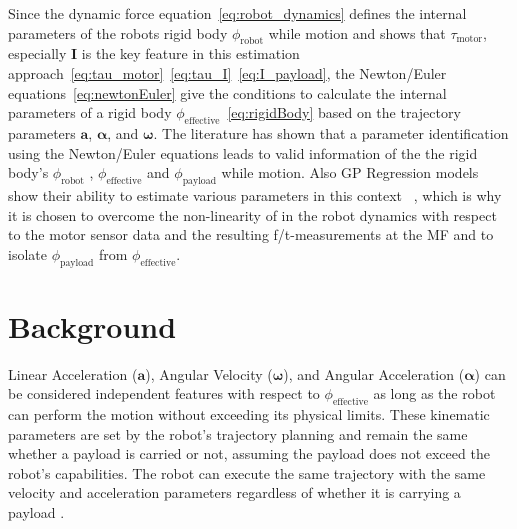     Since the dynamic force equation~\eqref{eq:robot_dynamics} defines the internal parameters of the robots rigid body \(\phi_{\text{robot}}\) while motion and shows that \(\tau_{\text{motor}}\), especially \(\mathbf{I}\) is the key feature in this estimation approach~\eqref{eq:tau_motor}~\eqref{eq:tau_I}~\eqref{eq:I_payload}, the Newton/Euler equations~\eqref{eq:newtonEuler} give the conditions to calculate the internal parameters of a rigid body \(\phi_{\text{effective}}\)~\eqref{eq:rigidBody} based on the trajectory parameters \(\mathbf{a}\), \(\boldsymbol{\alpha}\), and \(\boldsymbol{\omega}\). The literature has shown that a parameter identification using the Newton/Euler equations leads to valid information of the the rigid body's \(\phi_{\text{robot}}\) \cite{lee2020adaptive, nguyen2008learning, ren2020learning, leon2022parameter, dong2023dynamic, golluccio2021robot, deng2021dynamic}, \(\phi_{\text{effective}}\) \cite{haninger2022model, HANINGER2023104431, beckers2017stable, berger2015learning,blumberg2023estimation, motor_current_estimation, an2023, lu2023external, Kruzic2021, shan2024fine, berger2016estimating, liu2021sensorless, su2021deep} and \(\phi_{\text{payload}}\) \cite{Hu2020, Xu2022accurate, kurdas2022online, nadeau2022fast} while motion. Also GP Regression models show their ability to estimate various parameters in this context ~\cite{haninger2022model, beckers2017stable,nguyen2008learning, HANINGER2023104431,blumberg2023estimation,berger2015learning}, which is why it is chosen to overcome the non-linearity of in the robot dynamics with respect to the motor sensor data and the resulting f/t-measurements at the MF and to isolate \(\phi_{\text{payload}}\) from \(\phi_{\text{effective}}\).
    \section{Background}
    \label{sec:Background}

    Linear Acceleration (\(\mathbf{a}\)), Angular Velocity (\(\boldsymbol{\omega}\)), and Angular Acceleration (\(\boldsymbol{\alpha}\)) can be considered independent features with respect to \(\phi_{\text{effective}}\) as long as the robot can perform the motion without exceeding its physical limits. These kinematic parameters are set by the robot's trajectory planning and remain the same whether a payload is carried or not, assuming the payload does not exceed the robot's capabilities. The robot can execute the same trajectory with the same velocity and acceleration parameters regardless of whether it is carrying a payload \cite{urrea2018parameter}.
    

